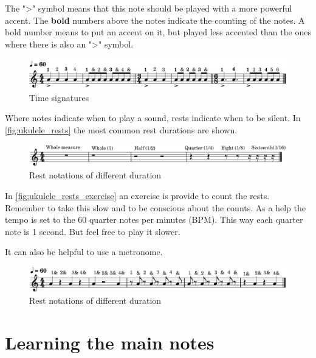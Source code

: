 The ">" symbol means that this note should be played with a more powerful accent. The \textbf{bold} numbers above the notes indicate the counting of the notes. A bold number means to put an accent on it, but played less accented than the ones where there is also an ">" symbol.

\begin{figure}[h]
	\centering
	\includegraphics[width=\textwidth]{../../MuseScore/Ukulele/MusicNotation/TimeSignature.png}
	\caption{Time signatures}
	\label{fig:ukulele_time_signatures}
\end{figure}

\newpage

Where notes indicate when to play a sound, rests indicate when to be silent. In \autoref{fig:ukulele_rests} the most common rest durations are shown.

\begin{figure}[h]
	\centering
	\includegraphics[width=\textwidth]{../../MuseScore/Ukulele/UkuleleRests.png}
	\caption{Rest notations of different duration}
	\label{fig:ukulele_rests}
\end{figure}

In \autoref{fig:ukulele_rests_exercise} an exercise is provide to count the rests. Remember to take this slow and to be conscious about the counts. As a help the tempo is set to the 60 quarter notes per minutes (BPM). This way each quarter note is 1 second. But feel free to play it slower.

It can also be helpful to use a metronome.

\begin{figure}[h]
	\centering
	\includegraphics[width=\textwidth]{../../MuseScore/Ukulele/UkuleleRestsExercise.png}
	\caption{Rest notations of different duration}
	\label{fig:ukulele_rests_exercise}
\end{figure}

\newpage

\section{Learning the main notes}

